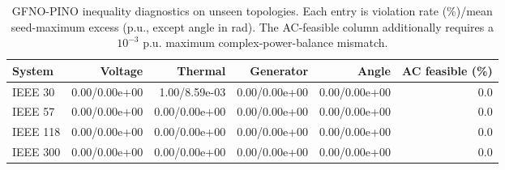 \begin{table}[t]
\centering
\caption{GFNO-PINO inequality diagnostics on unseen topologies. Each entry is violation rate (\%)/mean seed-maximum excess (p.u., except angle in rad). The AC-feasible column additionally requires a $10^{-3}$ p.u. maximum complex-power-balance mismatch.}
\label{tab:violations}
\scriptsize
\begin{tabular}{lrrrrr}
\toprule
System & Voltage & Thermal & Generator & Angle & AC feasible (\%) \\
\midrule
IEEE 30 & 0.00/0.00e+00 & 1.00/8.59e-03 & 0.00/0.00e+00 & 0.00/0.00e+00 & 0.0 \\
IEEE 57 & 0.00/0.00e+00 & 0.00/0.00e+00 & 0.00/0.00e+00 & 0.00/0.00e+00 & 0.0 \\
IEEE 118 & 0.00/0.00e+00 & 0.00/0.00e+00 & 0.00/0.00e+00 & 0.00/0.00e+00 & 0.0 \\
IEEE 300 & 0.00/0.00e+00 & 0.00/0.00e+00 & 0.00/0.00e+00 & 0.00/0.00e+00 & 0.0 \\
\bottomrule
\end{tabular}
\end{table}
